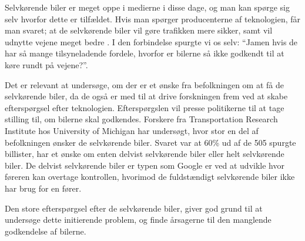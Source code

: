 Selvkørende biler er meget oppe i medierne i disse dage, og man kan spørge sig selv hvorfor dette er tilfældet. Hvis man spørger producenterne af teknologien, får man svaret; at de selvkørende biler vil gøre trafikken mere sikker, samt vil udnytte vejene meget bedre \cite{GOOG_SITE}. I den forbindelse spurgte vi os selv: ``Jamen hvis de har så mange tilsyneladende fordele, hvorfor er bilerne så ikke godkendt til at køre rundt på vejene?''. 

Det er relevant at undersøge, om der er et ønske fra befolkningen om at få de selvkørende biler, da de også er med til at drive forskningen frem ved at skabe efterspørgsel efter teknologien. Efterspørgslen vil presse politikerne til at tage stilling til, om bilerne skal godkendes. Forskere fra Transportation Research Institute hos University of Michigan har undersøgt, hvor stor en del af befolkningen ønsker de selvkørende biler\cite{UMTRI}. Svaret var at 60\% ud af de 505 spurgte billister, har et ønske om enten delvist selvkørende biler eller helt selvkørende biler. De delvist selvkørende biler er typen som Google er ved at udvikle hvor føreren kan overtage kontrollen, hvorimod de fuldstændigt selvkørende biler ikke har brug for en fører.

Den store efterspørgsel efter de selvkørende biler, giver god grund til at undersøge dette initierende problem, og finde årsagerne til den manglende godkendelse af bilerne.